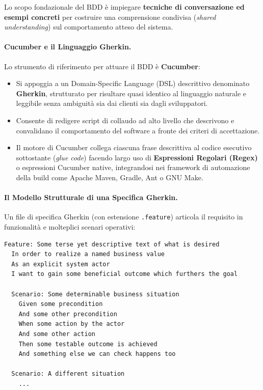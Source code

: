 \documentclass[12pt]{extarticle}
\begin{document}
\noindent Lo scopo fondazionale del BDD è impiegare \textbf{tecniche di conversazione ed esempi concreti} per costruire una comprensione condivisa (\textit{shared understanding}) sul comportamento atteso del sistema.

\paragraph{Cucumber e il Linguaggio Gherkin.}
Lo strumento di riferimento per attuare il BDD è \textbf{Cucumber}:
\begin{itemize}
    \item Si appoggia a un Domain-Specific Language (DSL) descrittivo denominato \textbf{Gherkin}, strutturato per risultare quasi identico al linguaggio naturale e leggibile senza ambiguità sia dai clienti sia dagli sviluppatori.
    \item Consente di redigere script di collaudo ad alto livello che descrivono e convalidano il comportamento del software a fronte dei criteri di accettazione.
    \item Il motore di Cucumber collega ciascuna frase descrittiva al codice esecutivo sottostante (\textit{glue code}) facendo largo uso di \textbf{Espressioni Regolari (Regex)} o espressioni Cucumber native, integrandosi nei framework di automazione della build come Apache Maven, Gradle, Ant o GNU Make.
\end{itemize}

\paragraph{Il Modello Strutturale di una Specifica Gherkin.}
Un file di specifica Gherkin (con estensione \texttt{.feature}) articola il requisito in funzionalità e molteplici scenari operativi:

\begin{lstlisting}[language=bash]
Feature: Some terse yet descriptive text of what is desired
  In order to realize a named business value
  As an explicit system actor
  I want to gain some beneficial outcome which furthers the goal

  Scenario: Some determinable business situation
    Given some precondition
    And some other precondition
    When some action by the actor
    And some other action
    Then some testable outcome is achieved
    And something else we can check happens too

  Scenario: A different situation
    ...
\end{lstlisting}
\end{document}
